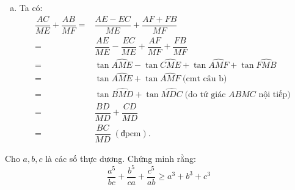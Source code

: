 \begin{ex}
{\begin{enumerate}[a)]
$\widehat{CME}=\widehat{CDE}$ (do $DECM$ nội tiếp). \hfill (ii)\\
Mặt khác, tứ giác $ACMB$ nội tiếp $(O)$ nên $\widehat{FBM}=\widehat{ACM}$. \hfill (1)\\
Xét hai tam giác vuông $FBM$ và $ECM$, ta có:
$\begin{cases}
\widehat{FBM}+\widehat{FMB}=90^\circ\\
\widehat{CME}+\widehat{ECM}=90^\circ
\end{cases}$.  \hfill (2)\\
Từ (1) và (2) suy ra $\widehat{FMB}=\widehat{CME}$. \hfill (iii)\\
Từ (i), (ii) và (iii) suy ra $\widehat{FDB}=\widehat{CDE}$.\\
$\Rightarrow E,F,D$ thẳng hàng (đpcm).
\item Ta có:
\begin{align*}
\dfrac{AC}{ME}+\dfrac{AB}{MF}=&\dfrac{AE-EC}{ME}+\dfrac{AF+FB}{MF}\\
=&\dfrac{AE}{ME}-\dfrac{EC}{ME}+\dfrac{AF}{MF}+\dfrac{FB}{MF}\\
=&\tan \widehat{AME}-\tan \widehat{CME}+\tan \widehat{AMF}+\tan \widehat{FMB} \\
=&\tan \widehat{AME}+\tan \widehat{AMF}\; \text{(cmt câu b)}\\
=&\tan \widehat{BMD}+\tan \widehat{MDC}\; \text{(do tứ giác $ABMC$ nội tiếp)}\\
=&\dfrac{BD}{MD}+\dfrac{CD}{MD}&\\
=&\dfrac{BC}{MD}\; (\text{đpcm}).
\end{align*}
\end{enumerate}
}
\end{ex}

\begin{ex}%
    Cho $a,b,c$ là các số thực dương. Chứng minh rằng:
    $$\dfrac{a^5}{bc}+\dfrac{b^5}{ca}+\dfrac{c^5}{ab}\ge a^3+b^3+c^3$$
\end{ex}


